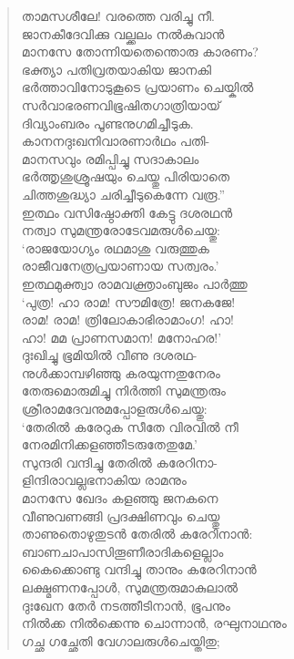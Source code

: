 \begin{verse}
താമസശീലേ! വരത്തെ വരിച്ചു നീ.\\
ജാനകീദേവിക്കു വല്ക്കലം നല്‍കുവാന്‍\\
മാനസേ തോന്നിയതെന്തൊരു കാരണം?\\
ഭക്ത്യാ പതിവ്രതയാകിയ ജാനകി\\
ഭര്‍ത്താവിനോടുകൂടെ പ്രയാണം ചെയ്കില്‍\\
സര്‍വാഭരണവിഭൂഷിതഗാത്രിയായ്\\
ദിവ്യാംബരം പൂണ്ടനുഗമിച്ചീടുക.\\
കാനനദുഃഖനിവാരണാര്‍ഥം പതി-\\
മാനസവും രമിപ്പിച്ചു സദാകാലം\\
ഭര്‍ത്തൃശുശ്രൂഷയും ചെയ്തു പിരിയാതെ\\
ചിത്തശുദ്ധ്യാ ചരിച്ചീടുകെന്നേ വരൂ.”\\
ഇത്ഥം വസിഷ്ഠോക്തി കേട്ടു ദശരഥന്‍\\
നത്വാ സുമന്ത്രരോടേവമരുള്‍ചെയ്തു:\\
‘രാജയോഗ്യം രഥമാശു വരുത്തുക\\
രാജീവനേത്രപ്രയാണായ സത്വരം.’\\
ഇത്ഥമുക്ത്വാ രാമവക്ത്രാംബുജം പാര്‍ത്തു\\
‘പുത്ര! ഹാ രാമ! സൗമിത്രേ! ജനകജേ!\\
രാമ! രാമ! ത്രിലോകാഭിരാമാംഗ! ഹാ!\\
ഹാ! മമ പ്രാണസമാന! മനോഹര!’\\
ദുഃഖിച്ചു ഭൂമിയില്‍ വീണു ദശരഥ-\\
നുള്‍ക്കാമ്പഴിഞ്ഞു കരയുന്നതുനേരം\\
തേരുമൊരുമിച്ചു നിര്‍ത്തി സുമന്ത്രരും\\
ശ്രീരാമദേവനുമപ്പോളരുള്‍ചെയ്തു:\\
‘തേരില്‍ കരേറുക സീതേ വിരവില്‍ നീ\\
നേരമിനിക്കളഞ്ഞീടരുതേതുമേ.’\\
സുന്ദരി വന്ദിച്ചു തേരില്‍ കരേറിനാ-\\
ളിന്ദിരാവല്ലഭനാകിയ രാമനും\\
മാനസേ ഖേദം കളഞ്ഞു ജനകനെ\\
വീണുവണങ്ങി പ്രദക്ഷിണവും ചെയ്തു\\
താണുതൊഴുതുടന്‍ തേരില്‍ കരേറിനാന്‍:\\
ബാണചാപാസിതൂണീരാദികളെല്ലാം\\
കൈക്കൊണ്ടു വന്ദിച്ചു താനും കരേറിനാന്‍\\
ലക്ഷ്മണനപ്പോള്‍, സുമന്ത്രരുമാകുലാല്‍\\
ദുഃഖേന തേര്‍ നടത്തീടിനാന്‍, ഭൂപനും\\
നില്‍ക്ക നില്‍ക്കെന്നു ചൊന്നാന്‍, രഘുനാഥനും\\
ഗച്ഛ ഗച്ഛേതി വേഗാലരുള്‍ചെയ്തിതു;\\

\end{verse}
